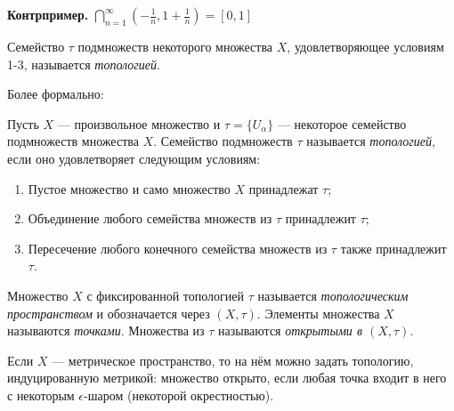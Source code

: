 \noindent \textbf{Контрпример.}
    $\bigcap\limits_{n=1}^{\infty} \left(-\frac{1}{n}, 1 + \frac{1}{n}\right) = [0,1]$



\begin{definition}
    Семейство $\tau$ подмножеств некоторого множества $X$, удовлетворяющее условиям 1-3, называется \textit{топологией}.
\end{definition}

Более формально:
\begin{definition}
    Пусть $X$ — произвольное множество и $\tau = \{U_{\alpha}\}$ — некоторое семейство подмножеств множества $X$. Семейство подмножеств $\tau$ называется \textit{топологией}, если оно удовлетворяет следующим условиям:
    \begin{enumerate}
        \item Пустое множество и само множество $X$ принадлежат $\tau$;
        \item Объединение любого семейства множеств из $\tau$ принадлежит $\tau$;
        \item Пересечение любого конечного семейства множеств из $\tau$ также принадлежит $\tau$.
    \end{enumerate}
\end{definition}

\begin{definition}
    Множество $X$ с фиксированной топологией $\tau$ называется \textit{топологическим пространством} и обозначается через $(X, \tau)$. Элементы множества $X$ называются \textit{точками}. Множества из $\tau$ называются \textit{открытыми в $(X, \tau)$}.
\end{definition}

Если $X$ — метрическое пространство, то на нём можно задать топологию, индуцированную метрикой: множество открыто, если любая точка входит в него с некоторым $\epsilon$-шаром (некоторой окрестностью).

